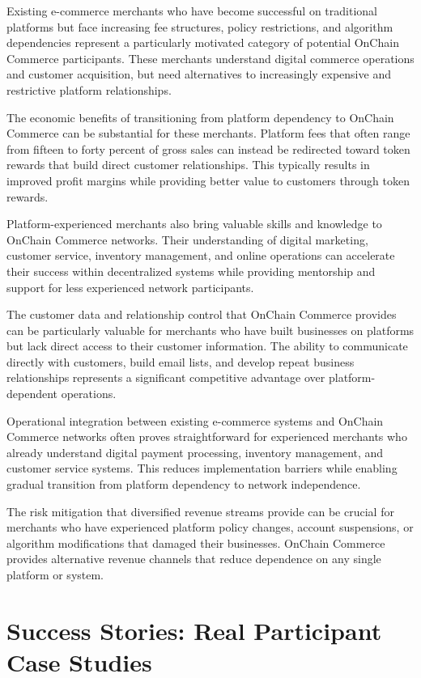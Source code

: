 \documentclass[
  Letterpaper,
]{scrbook}
\begin{document}
Existing e-commerce merchants who have become successful on traditional
platforms but face increasing fee structures, policy restrictions, and
algorithm dependencies represent a particularly motivated category of
potential OnChain Commerce participants. These merchants understand
digital commerce operations and customer acquisition, but need
alternatives to increasingly expensive and restrictive platform
relationships.

The economic benefits of transitioning from platform dependency to
OnChain Commerce can be substantial for these merchants. Platform fees
that often range from fifteen to forty percent of gross sales can
instead be redirected toward token rewards that build direct customer
relationships. This typically results in improved profit margins while
providing better value to customers through token rewards.

Platform-experienced merchants also bring valuable skills and knowledge
to OnChain Commerce networks. Their understanding of digital marketing,
customer service, inventory management, and online operations can
accelerate their success within decentralized systems while providing
mentorship and support for less experienced network participants.

The customer data and relationship control that OnChain Commerce
provides can be particularly valuable for merchants who have built
businesses on platforms but lack direct access to their customer
information. The ability to communicate directly with customers, build
email lists, and develop repeat business relationships represents a
significant competitive advantage over platform-dependent operations.

Operational integration between existing e-commerce systems and OnChain
Commerce networks often proves straightforward for experienced merchants
who already understand digital payment processing, inventory management,
and customer service systems. This reduces implementation barriers while
enabling gradual transition from platform dependency to network
independence.

The risk mitigation that diversified revenue streams provide can be
crucial for merchants who have experienced platform policy changes,
account suspensions, or algorithm modifications that damaged their
businesses. OnChain Commerce provides alternative revenue channels that
reduce dependence on any single platform or system.

\section{Success Stories: Real Participant Case
Studies}\label{success-stories-real-participant-case-studies}
\end{document}
